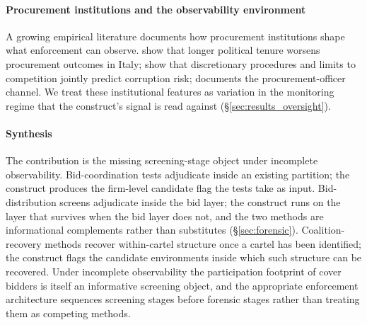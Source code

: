\paragraph{Procurement institutions and the observability
environment} A growing empirical literature documents how
procurement institutions shape what enforcement can observe.
\citet{coviello2017tenure} show that longer political tenure
worsens procurement outcomes in Italy;
\citet{decarolis2020rules} show that discretionary procedures and
limits to competition jointly predict corruption risk;
\citet{decarolis2017corruption} documents the
procurement-officer channel. We treat these institutional
features as variation in the monitoring regime that the
construct's signal is read against
(§\ref{sec:results_oversight}).

\paragraph{Synthesis} The contribution is the missing
screening-stage object under incomplete observability.
Bid-coordination tests \citep{bajari2003deciding} adjudicate
inside an existing partition; the construct produces the
firm-level candidate flag the tests take as input.
Bid-distribution screens
\citep{imhof2019detecting,wallimann2023machine} adjudicate
inside the bid layer; the construct runs on the layer that
survives when the bid layer does not, and the two methods are
informational complements rather than substitutes
(§\ref{sec:forensic}). Coalition-recovery methods
\citep{conley2016detecting} recover within-cartel structure once
a cartel has been identified; the construct flags the candidate
environments inside which such structure can be recovered. Under
incomplete observability the participation footprint of cover
bidders is itself an informative screening object, and the
appropriate enforcement architecture sequences screening stages
before forensic stages rather than treating them as competing
methods.
